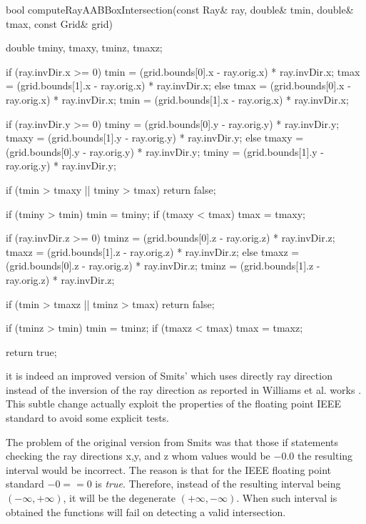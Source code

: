 \documentclass[12pt,a4paper]{extarticle}
\newcommand{\linespace}{\vspace{8pt}}
\begin{document}
\begin{cpp}[caption={Ray-box intersection checking function that also return the points in space along the ray of intersection.},label=code:intersection]
bool computeRayAABBoxIntersection(const Ray& ray, 
		double& tmin, double& tmax, const Grid& grid) {
	double  tminy, tmaxy, tminz, tmaxz;

	if (ray.invDir.x >= 0) {
		tmin = (grid.bounds[0].x - ray.orig.x) * ray.invDir.x;
		tmax = (grid.bounds[1].x - ray.orig.x) * ray.invDir.x;
	}
	else {
		tmax = (grid.bounds[0].x - ray.orig.x) * ray.invDir.x;
		tmin = (grid.bounds[1].x - ray.orig.x) * ray.invDir.x;
	}

	if (ray.invDir.y >= 0) {
		tminy = (grid.bounds[0].y - ray.orig.y) * ray.invDir.y;
		tmaxy = (grid.bounds[1].y - ray.orig.y) * ray.invDir.y;
	}
	else {
		tmaxy = (grid.bounds[0].y - ray.orig.y) * ray.invDir.y;
		tminy = (grid.bounds[1].y - ray.orig.y) * ray.invDir.y;
	}

	if (tmin > tmaxy || tminy > tmax) return false;

	if (tminy > tmin) tmin = tminy;
	if (tmaxy < tmax) tmax = tmaxy;

	if (ray.invDir.z >= 0) {
		tminz = (grid.bounds[0].z - ray.orig.z) * ray.invDir.z;
		tmaxz = (grid.bounds[1].z - ray.orig.z) * ray.invDir.z;
	}
	else {
		tmaxz = (grid.bounds[0].z - ray.orig.z) * ray.invDir.z;
		tminz = (grid.bounds[1].z - ray.orig.z) * ray.invDir.z;
	}

	if (tmin > tmaxz || tminz > tmax) return false;

	if (tminz > tmin) tmin = tminz;
	if (tmaxz < tmax) tmax = tmaxz;

	return true;
}
\end{cpp}


\cite{Williams:2005} it is indeed an improved version of Smits' \cite{Smits:1998}
which uses directly ray direction instead of the inversion of the ray direction as reported in Williams et al. works \cite{Williams:2005}. This subtle change actually exploit the properties of the floating point IEEE standard \cite{IEEE:30711} to avoid some explicit tests. 
\linespace

The problem of the original version from Smits was that those if statements checking the ray directions x,y, and z whom values would be $-0.0$ the resulting interval would be incorrect. The reason is that for the IEEE floating point standard $-0 == 0$ is \emph{true}. Therefore, instead of the resulting interval being $(-\infty, +\infty)$, it will be the degenerate $(+\infty,-\infty)$. When such interval is obtained the functions will fail on detecting a valid intersection.
\linespace
\end{document}
